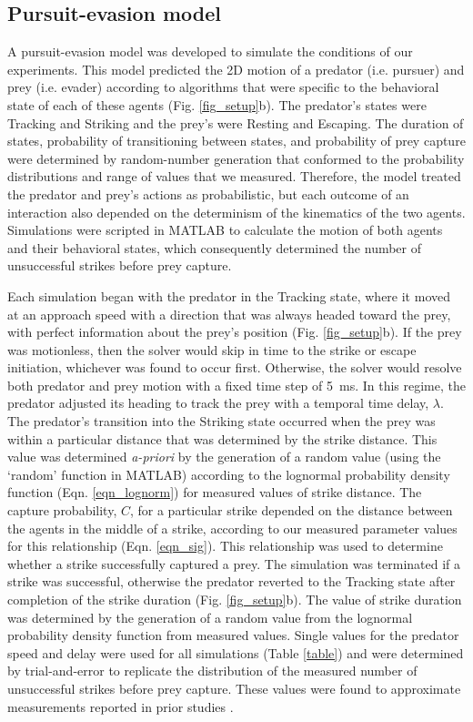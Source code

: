 \documentclass[]{rsos}%
\begin{document}
\subsection{Pursuit-evasion model}
A pursuit-evasion model was developed to simulate the conditions of our experiments. 
This model predicted the 2D motion of a predator (i.e. pursuer) and prey (i.e. evader) \cite{Isaacs:1965uz} according to algorithms that were specific to the behavioral state of each of these agents (Fig. \ref{fig_setup}b). 
The predator's states were Tracking and Striking and the prey's were Resting and Escaping. 
The duration of states, probability of transitioning between states, and probability of prey capture were determined by random-number generation that conformed to the probability distributions and range of values that we measured.
Therefore, the model treated the predator and prey's actions as probabilistic, but each outcome of an interaction also depended on the determinism of the kinematics of the two agents.
Simulations were scripted in MATLAB to calculate the motion of both agents and their behavioral states, which consequently determined the number of unsuccessful strikes before prey capture.

Each simulation began with the predator in the Tracking state, where it moved at an approach speed with a direction that was always headed toward the prey, with perfect information about the prey's position (Fig. \ref{fig_setup}b). 
If the prey was motionless, then the solver would skip in time to the strike or escape initiation, whichever was found to occur first.
Otherwise, the solver would resolve both predator and prey motion with a fixed time step of \SI{5}{\ms}. 
In this regime, the predator adjusted its heading to track the prey with a temporal time delay, $\lambda$.  
The predator's transition into the Striking state occurred when the prey was within a particular distance that was determined by the strike distance. 
This value was determined \textit{a-priori} by the generation of a random value (using the `random' function in MATLAB) according to the lognormal probability density function (Eqn. \ref{eqn_lognorm}) for measured values of strike distance.
The capture probability, $C$, for a particular strike depended on the distance between the agents in the middle of a strike, according to our measured parameter values for this relationship (Eqn. \ref{eqn_sig}).
This relationship was used to determine whether a strike successfully captured a prey.
The simulation was terminated if a strike was successful, otherwise the predator reverted to the Tracking state after completion of the strike duration (Fig. \ref{fig_setup}b).
The value of strike duration was determined by the generation of a random value from the lognormal probability density function from measured values.
Single values for the predator speed and delay were used for all simulations (Table \ref{table}) and were determined by trial-and-error to replicate the distribution of the measured number of unsuccessful strikes before prey capture. 
These values were found to approximate measurements reported in prior studies \cite{McHenry:2005tc, Stewart:2013bha}. 
\end{document}
